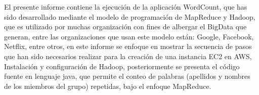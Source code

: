 \documentclass[
	spanish, %
	a4paper, oneside
]{article}
\begin{document}
	
\templatePortrait

\templatePagecfg

\begin{abstractd}
El presente informe contiene la ejecución de la aplicación WordCount, que has sido desarrollado mediante el modelo de programación de MapReduce y Hadoop, que es utilizado por muchas organización con fines de albergar el BigData que generan, entre las organizaciones que usan este modelo están: Google, Facebook, Netflix, entre otros, en este informe se enfoque en mostrar la secuencia de pasos que han sido necesarios realizar para la creación de una instancia EC2 en AWS, Instalación y configuración de Hadoop, posteriormente se presenta el código fuente en lenguaje java, que permite el conteo de palabras (apellidos y nombres de los miembros del grupo) repetidas, bajo el enfoque MapReduce.  
\end{abstractd}

\templateIndex

\templateFinalcfg



\end{document}
